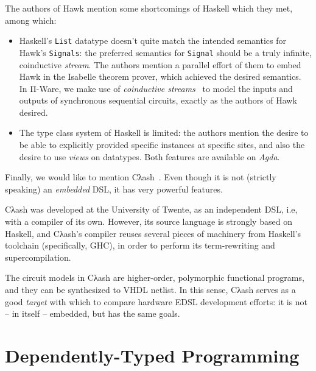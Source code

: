             The authors of Hawk mention some shortcomings of Haskell which they met, among which:

            \begin{itemize}
                \item Haskell's \texttt{List} datatype doesn't quite match
                    the intended semantics for Hawk's \texttt{Signals}:
                    the preferred semantics for \texttt{Signal} should be a truly infinite, coinductive \emph{stream}.
                    The authors mention a parallel effort of them to embed Hawk in the Isabelle theorem prover,
                    which achieved the desired semantics.
                    In Π-Ware, we make use of \emph{coinductive streams}~\cite{introduction-coalgebra-jacobs}
                    to model the inputs and outputs of synchronous sequential circuits,
                    exactly as the authors of Hawk desired.
                \item The type class system of Haskell is limited: the authors mention the desire to be able
                    to explicitly provided specific instances at specific sites,
                    and also the desire to use \emph{views} on datatypes.
                    Both features are available on \emph{Agda}.
            \end{itemize}

            Finally, we would like to mention Cλash~\cite{clash-baaij}.
            Even though it is not (strictly speaking) an \emph{embedded} \ac{DSL},
            it has very powerful features.

            Cλash was developed at the University of Twente,
            as an independent \ac{DSL}, i.e, with a compiler of its own.
            However, its source language is strongly based on Haskell, and Cλash's compiler
            reuses several pieces of machinery from Haskell's toolchain (specifically, GHC),
            in order to perform its term-rewriting and supercompilation.

            The circuit models in Cλash are higher-order, polymorphic functional programs,
            and they can be synthesized to \ac{VHDL} netlist.
            In this sense, Cλash serves as a good \emph{target} with which to compare hardware
            \ac{EDSL} development efforts: it is not – in itself – embedded, but has the same goals.


    \section{Dependently-Typed Programming}
    \label{sec:dtp}

